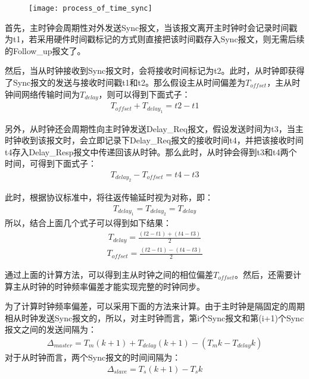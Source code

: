 \begin{figure}[!hbp]
  \centering
  \begin{minipage}[b]{0.6\textwidth}
    \captionstyle{\centering}
    \centering
    \texttt{[image: process\_of\_time\_sync]}
  \end{minipage}     
\end{figure}

首先，主时钟会周期性对外发送Sync报文，当该报文离开主时钟时会记录时间戳为t1，若采用硬件时间戳标记的方式则直接把该时间戳存入Sync报文，则无需后续的Follow\_up报文了。

然后，当从时钟接收到Sync报文时，会将接收时间标记为t2。此时，从时钟即获得了Sync报文的发送与接收时间戳t1和t2。那么假设主从时间偏差为$T_{offset}$，主从时钟间网络传输时间为$T_{delay}$，则可以得到下面式子：
\begin{align}
	T_{offset} + T_{delay_1} = t2 - t1
\end{align}

另外，从时钟还会周期性向主时钟发送Delay\_Req报文，假设发送时间为t3，当主时钟收到该报文时，会立即记录下Delay\_Req报文的接收时间t4，并把该接收时间t4存入Delay\_Resp报文中传递回该从时钟。那么此时，从时钟会得到t3和t4两个时间，可得到下面式子：
\begin{align}
	T_{delay_2} - T_{offset} = t4 - t3
\end{align}

此时，根据协议标准中，将往返传输延时视为对称，即：
\begin{align}
	T_{delay_1} = T_{delay_2} = T_{delay}
\end{align}
所以，结合上面几个式子可以得到如下结果：
\begin{align}
	T_{delay} = \frac{(t2 - t1) + (t4 - t3)}{2}
\end{align}
\begin{align}
	T_{offset} = \frac{(t2 - t1) - (t4 - t3)}{2}
\end{align}

通过上面的计算方法，可以得到主从时钟之间的相位偏差$T_{offset}$。然后，还需要计算主从时钟的时钟频率偏差才能实现完整的时钟同步。

为了计算时钟频率偏差，可以采用下面的方法来计算。由于主时钟是隔固定的周期相从时钟发送Sync报文的，所以，对主时钟而言，第i个Sync报文和第(i+1)个Sync报文之间的发送间隔为：
\begin{align}
	\Delta _{master} = T_{m}(k + 1) + T_{delay}(k + 1) - (T_{m}k - T_{delay}k)
\end{align}
对于从时钟而言，两个Sync报文的时间间隔为：
\begin{align}
	\Delta _{slave} = T_{s}(k + 1) - T_{s}k
\end{align}


